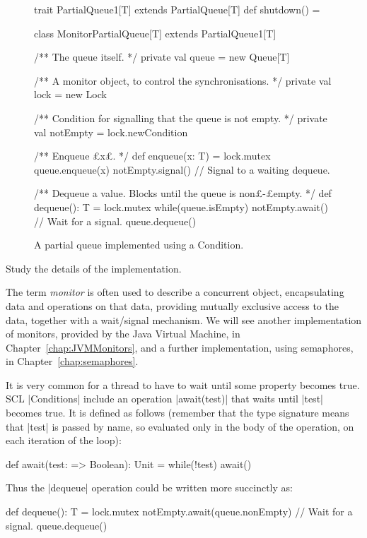 
\begin{figure}
\begin{scala}
trait PartialQueue1[T] extends PartialQueue[T]{
  def shutdown() = {}
}

class MonitorPartialQueue[T] extends PartialQueue1[T]{
  /** The queue itself. */
  private val queue = new Queue[T]

  /** A monitor object, to control the synchronisations. */
  private val lock = new Lock

  /** Condition for signalling that the queue is not empty. */
  private val notEmpty = lock.newCondition

  /** Enqueue £x£. */
  def enqueue(x: T) = lock.mutex{
    queue.enqueue(x)
    notEmpty.signal() // Signal to a waiting dequeue.
  } 

  /** Dequeue a value.  Blocks until the queue is non£-£empty. */
  def dequeue(): T = lock.mutex{
    while(queue.isEmpty) notEmpty.await() // Wait for a signal.
    queue.dequeue()
  }
}
\end{scala}
\caption{A partial queue implemented using a {\scalastyle Condition}.}
\label{fig:MonitorPartialQueue}
\end{figure}


\begin{instruction}
Study the details of the implementation. 
\end{instruction}

The term \emph{monitor} is often used to describe a concurrent object,
encapsulating data and operations on that data, providing mutually exclusive
access to the data, together with a wait/signal mechanism.  We will see
another implementation of monitors, provided by the Java Virtual Machine, in
Chapter~\ref{chap:JVMMonitors}, and a further implementation, using
semaphores, in Chapter~\ref{chap:semaphores}.   

It is very common for a thread to have to wait until some property becomes
true.  SCL |Conditions| include an operation |await(test)| that waits until
|test| becomes true.  It is defined as follows (remember that the type
signature means that |test| is passed by name, so evaluated only in the body
of the operation, on each iteration of the loop):
%
\begin{scala}
  def await(test: => Boolean): Unit = while(!test) await()
\end{scala}
%
Thus the |dequeue| operation could be written more succinctly as:
\begin{scala}
  def dequeue(): T = lock.mutex{
    notEmpty.await(queue.nonEmpty) // Wait for a signal.
    queue.dequeue()
  }
\end{scala}

